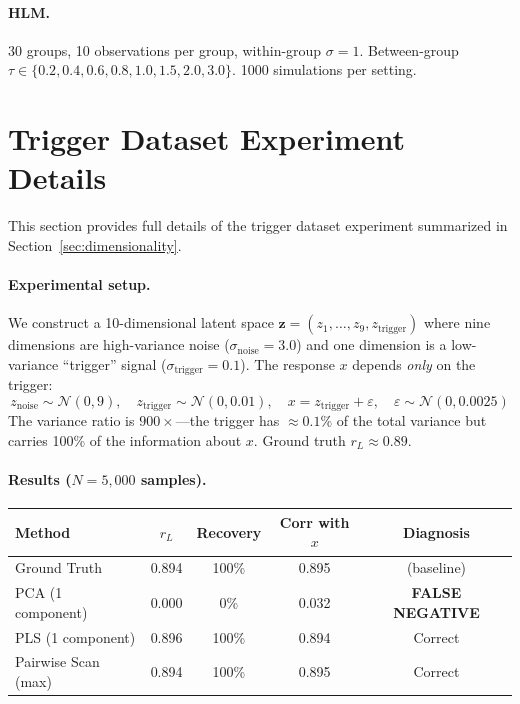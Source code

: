 \documentclass[10pt]{article} %
\theoremstyle{plain}
\theoremstyle{definition}
\begin{document}
\paragraph{HLM.} 30 groups, 10 observations per group, within-group $\sigma = 1$. Between-group $\tau \in \{0.2, 0.4, 0.6, 0.8, 1.0, 1.5, 2.0, 3.0\}$. 1000 simulations per setting.

\section{Trigger Dataset Experiment Details}
\label{app:trigger}

This section provides full details of the trigger dataset experiment summarized in Section~\ref{sec:dimensionality}.

\paragraph{Experimental setup.} We construct a 10-dimensional latent space $\mathbf{z} = (z_1, \ldots, z_9, z_{\text{trigger}})$ where nine dimensions are high-variance noise ($\sigma_{\text{noise}} = 3.0$) and one dimension is a low-variance ``trigger'' signal ($\sigma_{\text{trigger}} = 0.1$). The response $x$ depends \emph{only} on the trigger:
\begin{equation}
z_{\text{noise}} \sim \mathcal{N}(0, 9), \quad z_{\text{trigger}} \sim \mathcal{N}(0, 0.01), \quad x = z_{\text{trigger}} + \varepsilon, \quad \varepsilon \sim \mathcal{N}(0, 0.0025)
\end{equation}
The variance ratio is $900\times$---the trigger has $\approx 0.1\%$ of the total variance but carries 100\% of the information about $x$. Ground truth $r_L \approx 0.89$.

\paragraph{Results ($N = 5{,}000$ samples).}

\begin{center}
\begin{tabular}{lcccc}
\toprule
\textbf{Method} & \textbf{$r_L$} & \textbf{Recovery} & \textbf{Corr with $x$} & \textbf{Diagnosis} \\
\midrule
Ground Truth & 0.894 & 100\% & 0.895 & (baseline) \\
PCA (1 component) & 0.000 & 0\% & 0.032 & \textbf{FALSE NEGATIVE} \\
PLS (1 component) & 0.896 & 100\% & 0.894 & Correct \\
Pairwise Scan (max) & 0.894 & 100\% & 0.895 & Correct \\
\bottomrule
\end{tabular}
\end{center}
\end{document}
